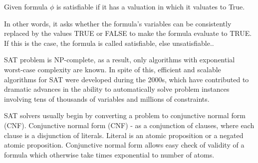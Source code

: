 Given formula  $\phi$ is satisfiable if it has a valuation in which it valuates to True.

In other words, it asks whether the formula's variables can be 
consistently replaced by the values TRUE or FALSE to make the formula 
evaluate to TRUE. If this is the case, the formula is called satisfiable, 
else unsatisfiable.\cite{HuthR1}.

SAT problem is NP-complete, as a result, only algorithms with exponential 
worst-case complexity are known. In spite of this, efficient and 
scalable algorithms for SAT were developed during the 2000s, which have 
contributed to dramatic advances in the ability to automatically 
solve problem instances involving tens of thousands of variables and 
millions of constraints.%

SAT solvers usually begin by converting a problem to conjunctive normal form (CNF).
Conjunctive normal form (CNF) - as a conjunction of clauses, where each 
clause is a disjunction of literals.
Literal is an atomic proposition or a negated atomic proposition.
Conjunctive normal form allows easy check of validity of a formula which otherwise take times exponential to number of atoms.




